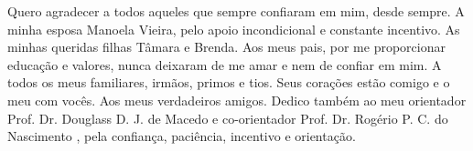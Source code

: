\documentclass[
	12pt,				%
	oneside,			%
	a4paper,			%
	english,			%
	brazil				%
	]{abntex2ppgsi}
\begin{document}
%
% 
%
\begin{agradecimentos}
Quero agradecer a todos aqueles que sempre confiaram em mim, desde sempre.
A minha esposa Manoela Vieira, pelo apoio incondicional e constante incentivo. As minhas queridas filhas Tâmara e Brenda. Aos meus pais, por me proporcionar educação e valores, nunca deixaram de me amar e nem de confiar em mim. A todos os meus familiares, irmãos, primos e tios. Seus corações estão comigo e o meu com vocês. Aos meus verdadeiros amigos. Dedico também ao meu orientador Prof. Dr. Douglass D. J. de Macedo e co-orientador  Prof. Dr. Rogério P. C. do Nascimento , pela confiança, paciência, incentivo e orientação. 
\end{agradecimentos}

%
% 

\end{document}
